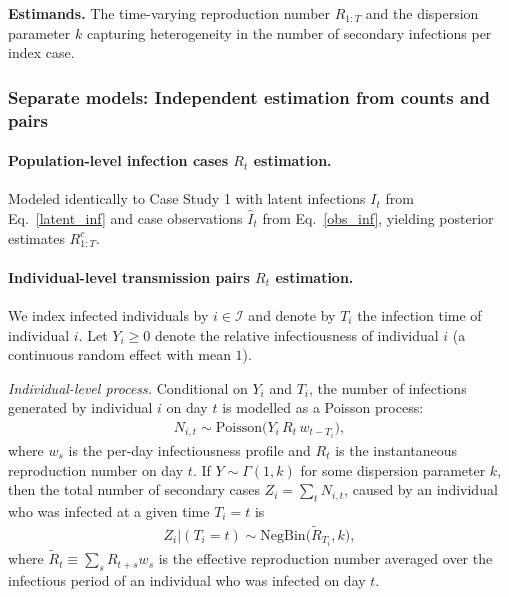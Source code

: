 \documentclass{article}
\begin{document}
\noindent\textbf{Estimands.} The time-varying reproduction number $R_{1:T}$ and the dispersion parameter $k$ capturing heterogeneity in the number of secondary infections per index case. 

\subsubsection{Separate models: Independent estimation from counts and pairs}

\paragraph{Population-level infection cases $R_t$ estimation.}
Modeled identically to Case Study 1 with latent infections $I_t$ from Eq.~\eqref{latent_inf} and case observations $\widehat{I}_t$ from  Eq.~\eqref{obs_inf}, yielding posterior estimates $R_{1:T}^c$.

\paragraph{Individual-level transmission pairs $R_t$ estimation.}
We index infected individuals by $i\in\mathcal{I}$ and denote by $T_i$ the infection time of individual $i$. Let $Y_i\ge0$ denote the relative infectiousness of individual $i$ (a continuous random effect with mean $1$).

\emph{Individual-level process.}  Conditional on $Y_i$ and $T_i$, the number of infections generated by individual $i$ on day $t$ is modelled as a Poisson process:
\begin{align}\label{cs3_ind_process}
N_{i,t} \sim \mathrm{Poisson}\!\big(Y_i\, R_t\, w_{t-T_i}\big), 
\end{align}
where $w_s$ is the per-day infectiousness profile and $R_t$ is the instantaneous reproduction number on day $t$. If $Y\sim \Gamma (1,k)$ for some dispersion parameter $k$, then the total  number of secondary cases $Z_i = \sum_{t} N_{i,t}$, caused by an individual who was infected at a given time $T_i=t$  is
\begin{align}\label{offspring_cases}
Z_i |(T_i=t)\sim \mathrm{NegBin}\!\Big(\tilde{R}_{T_i}, k\Big), 
\end{align}
where $\widetilde{R}_t \equiv \sum_{s} R_{t+s} w_s$ is the effective reproduction number averaged over the infectious period of an individual who was infected on day $t$.
\end{document}
